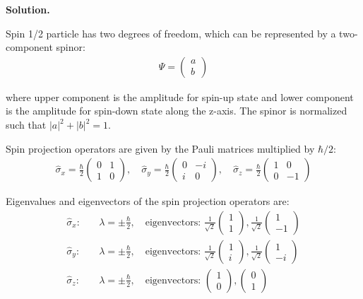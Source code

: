 \documentclass[11pt,a4paper]{article}
\newenvironment{solution}{\vspace{1cm} \par\textbf{Solution.} \vspace{1cm}}{\newpage}
\begin{document}
\begin{solution}

Spin 1/2 particle has two degrees of freedom, which can be represented 
by a two-component spinor:
\begin{align*}
  \Psi = \begin{pmatrix} a \\ b \end{pmatrix}
\end{align*}

where upper component is the amplitude for spin-up state and lower component 
is the amplitude for spin-down state along the z-axis. 
The spinor is normalized such that $|a|^2 + |b|^2 = 1$.

\vspace{0.2cm}

Spin projection operators are given by the Pauli matrices multiplied by $\hbar/2$:
\begin{align*}
  \hat{\sigma}_x = \frac{\hbar}{2}\begin{pmatrix} 0 & 1 \\ 1 & 0 \end{pmatrix}, \quad
  \hat{\sigma}_y = \frac{\hbar}{2}\begin{pmatrix} 0 & -i \\ i & 0 \end{pmatrix}, \quad
  \hat{\sigma}_z = \frac{\hbar}{2}\begin{pmatrix} 1 & 0 \\ 0 & -1 \end{pmatrix}
\end{align*}

\vspace{0.2cm}

Eigenvalues and eigenvectors of the spin projection operators are:
\begin{align*}
  \hat{\sigma}_x: & \quad \lambda = \pm \frac{\hbar}{2}, \quad \text{eigenvectors: } \frac{1}{
\sqrt{2}}\begin{pmatrix} 1 \\ 1 \end{pmatrix}, \frac{1}{\sqrt{2}}\begin{pmatrix} 1 \\ -1 \end{pmatrix} \\
\hat{\sigma}_y: & \quad \lambda = \pm \frac{\hbar}{2}, \quad \text{eigenvectors: } \frac{1}{
\sqrt{2}}\begin{pmatrix} 1 \\ i \end{pmatrix}, \frac{1}{\sqrt{2}}\begin{pmatrix} 1 \\ -i \end{pmatrix} \\
\hat{\sigma}_z: & \quad \lambda = \pm \frac{\hbar}{2}, \quad \text{eigenvectors: } \begin{pmatrix}
  1 \\ 0 \end{pmatrix}, \begin{pmatrix} 0 \\ 1 \end{pmatrix}
\end{align*}


\end{solution}
\end{document}
